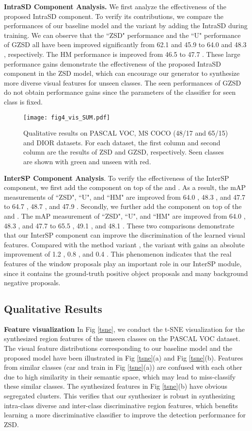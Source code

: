 \documentclass[10pt,twocolumn,letterpaper]{article}
\begin{document}
\textbf{IntraSD Component Analysis.} We first analyze the effectiveness of the proposed IntraSD component. To verify its contributions, we compare the performances of our baseline model and the variant by adding the IntraSD during training. We can observe that the ``ZSD" performance and the ``U" performance of GZSD all have been improved significantly from 62.1  and 45.9  to 64.0  and 48.3 , respectively. The HM performance is improved from 46.5  to 47.7 . These large performance gains demonstrate the effectiveness of the proposed IntraSD component in the ZSD model, which can encourage our generator to synthesize more diverse visual features for unseen classes. The seen performances of GZSD do not obtain performance gains since the parameters of the classifier for seen class is fixed.
\begin{figure*}[t]
  \centering
\texttt{[image: fig4\_vis\_SUM.pdf]}
   \caption{Qualitative results on PASCAL VOC, MS COCO (48/17 and 65/15) and DIOR datasets. For each dataset, the first column and second column are the results of ZSD and GZSD, respectively. Seen classes are shown with green and unseen with red.}
   \label{detection-results}
   \vspace{-4.2mm}
\end{figure*}


\textbf{InterSP Component Analysis}.  To verify the effectiveness of the InterSP component, we first add the  component on top of the  and . As a result, the mAP measurements of ``ZSD", ``U", and ``HM" are improved from 64.0 , 48.3 , and 47.7  to 64.7 , 48.7 , and 47.9 . Secondly, we further add the  component on top of the  and . The mAP measurement of ``ZSD", ``U", and ``HM" are improved from 64.0 , 48.3 , and 47.7  to 65.5 , 49.1 , and 48.1 . These two comparisons demonstrate that our InterSP component can improve the discrimination of the learned visual features. Compared with the method variant , the variant with  gains an absolute improvement of 1.2 , 0.8 , and 0.4 . This phenomenon indicates that the real features of the window proposals play an important role in our InterSP module, since it contains the ground-truth positive object proposals and many background negative proposals.

\subsection{Qualitative Results}
\textbf{Feature visualization} In Fig \ref{tsne}, we conduct the t-SNE \cite{van2008visualizing} visualization for the synthesized region features of the unseen classes on the PASCAL VOC dataset. The visual feature distributions corresponding to our baseline model and the proposed model have been illustrated in Fig \ref{tsne}(a) and Fig \ref{tsne}(b). Features from similar classes (car and train in Fig \ref{tsne}(a)) are confused with each other due to high similarity in their semantic space, which may lead to miss-classify these similar classes. The synthesized features in Fig \ref{tsne}(b) have obvious segregated clusters.
This verifies that our synthesizer is robust in synthesizing intra-class diverse and inter-class discriminative region features, which benefits learning a more discriminative classifier to improve the detection performance for ZSD.
\end{document}
